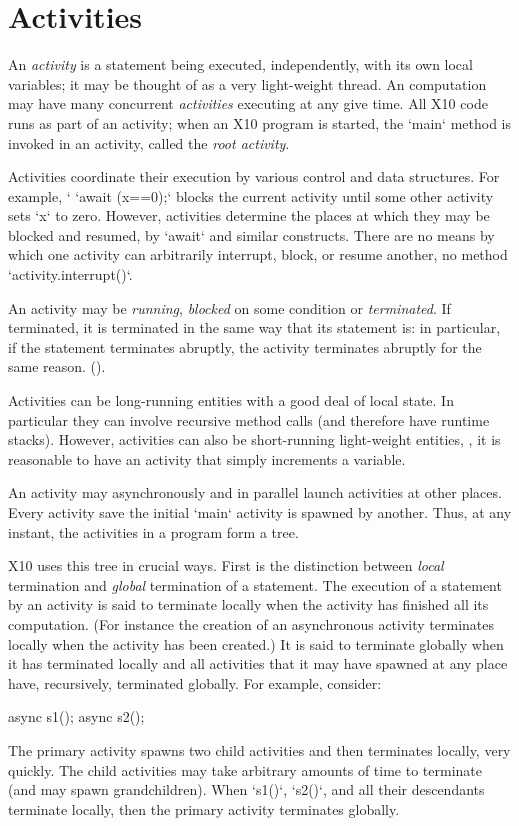 \chapter{Activities}\label{XtenActivities}

An {\em activity} is a statement being executed, independently, with its own
local variables; it may be thought of as a very light-weight thread. An
\Xten{} computation may have many concurrent {\em activities} executing at any
give time.  All X10 code runs as part of an activity; when an X10 program is
started, the \xcd`main` method is invoked in an activity, called the {\em root
activity}.


Activities coordinate their execution by various control and data structures.
For example, `
\xcd`await (x==0);` blocks the current activity until some other activity
sets \xcd`x` to zero.  However, activities determine the places at which they
may be blocked and resumed, by \xcd`await` and similar constructs.  There are
no means by which one activity can arbitrarily interrupt, block, or resume
another, no method  \xcd`activity.interrupt()`.

An activity may be {\em running}, {\em blocked} on some condition or {\em
terminated}. If terminated, it is terminated in the same way that its
statement is: in particular, if the statement terminates abruptly, the
activity terminates abruptly for the same reason.
().

Activities can be long-running entities with a good deal of local state.  In
particular they can involve recursive method calls (and therefore have runtime
stacks).  However, activities can also be short-running light-weight entities,
\eg, it is reasonable to have an activity that simply increments a variable.

An activity may asynchronously and in parallel launch activities at
other places.  Every activity save the initial \xcd`main` activity is spawned
by another.  Thus, at any instant, the activities in a program form a tree.

X10 uses this tree in crucial ways.  
First is the distinction 
between {\em local} termination and {\em global}
termination of a statement. The execution of a statement by an
activity is said to terminate locally when the activity has finished
all its computation. (For instance the
creation of an asynchronous activity terminates locally when the
activity has been created.)  It is said to terminate globally when it
has terminated locally and all activities that it may have spawned at
any place have, recursively, terminated globally.
For example, consider: 
\begin{xten}
async {s1();}
async {s2();}
\end{xten}
The primary activity spawns two child activities and then terminates locally,
very quickly.  The child activities may take arbitrary amounts of time to
terminate (and may spawn grandchildren).  When \xcd`s1()`, \xcd`s2()`, and
all their descendants terminate locally, then the primary activity terminates
globally. 


